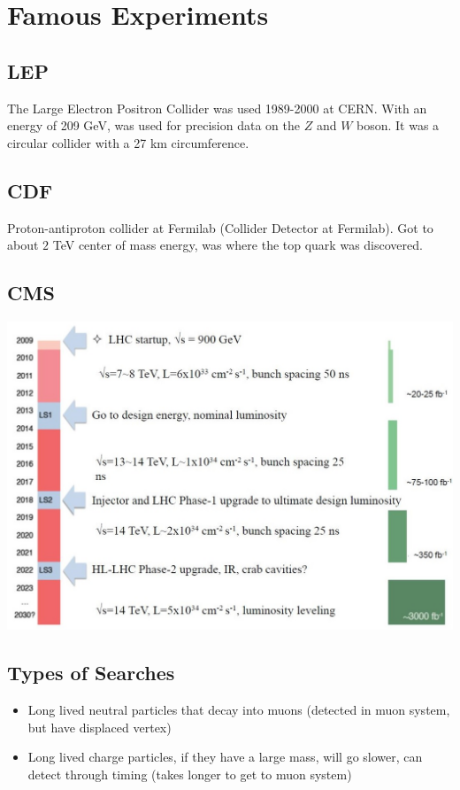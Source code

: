 \section{Famous Experiments}

\subsection{LEP}\label{lep}
The Large Electron Positron Collider was used 1989-2000 at CERN. With an energy of 209 GeV, was used for precision data on the $Z$ and $W$ boson. It was a circular collider with a 27 km circumference.
\subsection{CDF}
Proton-antiproton collider at Fermilab (Collider Detector at Fermilab). Got to about $2$ TeV center of mass energy, was where the top quark was discovered.

\subsection{CMS}


\includegraphics[width=1.0\textwidth]{physics/images/lhc_timeline}


\subsection{Types of Searches}
\begin{itemize}
    \item Long lived neutral particles that decay into muons (detected in muon system, but have displaced vertex)
    \item Long lived charge particles, if they have a large mass, will go slower, can detect through timing (takes longer to get to muon system)
\end{itemize}


